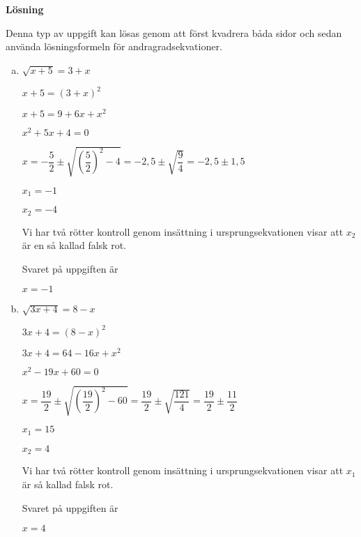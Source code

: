 \documentclass{article}
\begin{document}
\textbf{Lösning}

Denna typ av uppgift kan lösas genom att först kvadrera båda sidor och sedan använda lösningsformeln för andragradsekvationer.

\begin{enumerate}[(a)]
\item
$\sqrt{x+5}=3+x$

$x+5=(3+x)^2$

$x+5=9+6x+x^2$

$x^2+5x+4=0$

$x=-\dfrac{5}{2}\pm\sqrt{\left(\dfrac{5}{2}\right)^2-4}=-2,5\pm\sqrt{\dfrac{9}{4}}=-2,5\pm1,5$

$x_1 = -1$

$x_2 = -4$

Vi har två rötter kontroll genom insättning i ursprungsekvationen visar att $x_2$ är en så kallad falsk rot.

Svaret på uppgiften är 

$x = -1$

\item
$\sqrt{3x+4}=8-x$

$3x+4=(8-x)^2$

$3x+4=64-16x+x^2$

$x^2-19x+60=0$

$x=\dfrac{19}{2}\pm\sqrt{\left(\dfrac{19}{2}\right)^2-60}=\dfrac{19}{2}\pm\sqrt{\dfrac{121}{4}}=\dfrac{19}{2}\pm\dfrac{11}{2}$

$x_1 = 15$

$x_2 = 4$

Vi har två rötter kontroll genom insättning i ursprungsekvationen visar att $x_1$ är så kallad falsk rot.

Svaret på uppgiften är 

$x = 4$
\end{enumerate}
\end{document}
